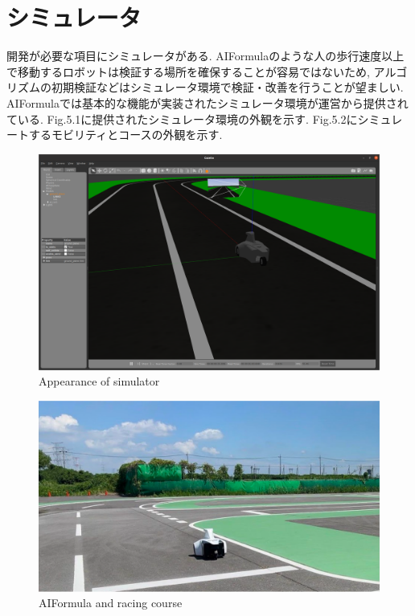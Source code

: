 
\section{シミュレータ}
開発が必要な項目にシミュレータがある.
AIFormulaのような人の歩行速度以上で移動するロボットは検証する場所を確保することが容易ではないため, アルゴリズムの初期検証などはシミュレータ環境で検証・改善を行うことが望ましい.
AIFormulaでは基本的な機能が実装されたシミュレータ環境が運営から提供されている.
Fig.5.1に提供されたシミュレータ環境の外観を示す.
Fig.5.2にシミュレートするモビリティとコースの外観を示す.

\begin{figure}[H]
  \centering
 \includegraphics[keepaspectratio, scale=0.2]
      {images/simulator.png}
 \caption{Appearance of simulator}
 \label{fig:simulator}
\end{figure}

\begin{figure}[H]
  \centering
 \includegraphics[keepaspectratio, scale=0.2]
      {images/realworld.png}
 \caption{AIFormula and racing course}
 \label{fig:simulator}
\end{figure}

